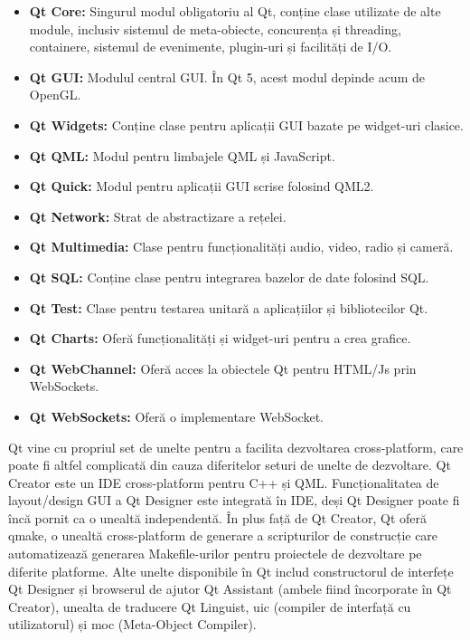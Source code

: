 \documentclass[a4paper,12pt]{report}
\begin{document}
\begin{itemize}
    \item \textbf{Qt Core:} Singurul modul obligatoriu al Qt, conține clase utilizate de alte module, inclusiv sistemul de meta-obiecte, concurența și threading, containere, sistemul de evenimente, plugin-uri și facilități de I/O.
    \item \textbf{Qt GUI:} Modulul central GUI. În Qt 5, acest modul depinde acum de OpenGL.
    \item \textbf{Qt Widgets:} Conține clase pentru aplicații GUI bazate pe widget-uri clasice.
    \item \textbf{Qt QML:} Modul pentru limbajele QML și JavaScript.
    \item \textbf{Qt Quick:} Modul pentru aplicații GUI scrise folosind QML2.
    \item \textbf{Qt Network:} Strat de abstractizare a rețelei.
    \item \textbf{Qt Multimedia:} Clase pentru funcționalități audio, video, radio și cameră.
    \item \textbf{Qt SQL:} Conține clase pentru integrarea bazelor de date folosind SQL.
    \item \textbf{Qt Test:} Clase pentru testarea unitară a aplicațiilor și bibliotecilor Qt.
    \item \textbf{Qt Charts:} Oferă funcționalități și widget-uri pentru a crea grafice.
    \item \textbf{Qt WebChannel:} Oferă acces la obiectele Qt pentru HTML/Js prin WebSockets.
    \item \textbf{Qt WebSockets:} Oferă o implementare WebSocket.
\end{itemize}

Qt vine cu propriul set de unelte pentru a facilita dezvoltarea cross-platform, care poate fi altfel complicată din cauza diferitelor seturi de unelte de dezvoltare. Qt Creator este un IDE cross-platform pentru C++ și QML. Funcționalitatea de layout/design GUI a Qt Designer este integrată în IDE, deși Qt Designer poate fi încă pornit ca o unealtă independentă. În plus față de Qt Creator, Qt oferă qmake, o unealtă cross-platform de generare a scripturilor de construcție care automatizează generarea Makefile-urilor pentru proiectele de dezvoltare pe diferite platforme. Alte unelte disponibile în Qt includ constructorul de interfețe Qt Designer și browserul de ajutor Qt Assistant (ambele fiind încorporate în Qt Creator), unealta de traducere Qt Linguist, uic (compiler de interfață cu utilizatorul) și moc (Meta-Object Compiler).
\end{document}
